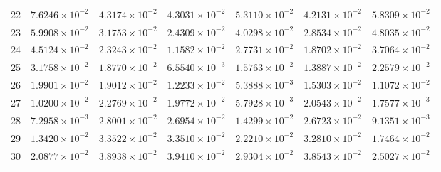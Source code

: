 \begin{table}[H]
\begin{tabular}{@{}rrrrrrr@{}}
22 & $7.6246\times10^{-2}$ & $4.3174\times10^{-2}$ & $4.3031\times10^{-2}$ & $5.3110\times10^{-2}$ & $4.2131\times10^{-2}$ & $5.8309\times10^{-2}$\\
23 & $5.9908\times10^{-2}$ & $3.1753\times10^{-2}$ & $2.4309\times10^{-2}$ & $4.0298\times10^{-2}$ & $2.8534\times10^{-2}$ & $4.8035\times10^{-2}$\\
24 & $4.5124\times10^{-2}$ & $2.3243\times10^{-2}$ & $1.1582\times10^{-2}$ & $2.7731\times10^{-2}$ & $1.8702\times10^{-2}$ & $3.7064\times10^{-2}$\\
25 & $3.1758\times10^{-2}$ & $1.8770\times10^{-2}$ & $6.5540\times10^{-3}$ & $1.5763\times10^{-2}$ & $1.3887\times10^{-2}$ & $2.2579\times10^{-2}$\\
26 & $1.9901\times10^{-2}$ & $1.9012\times10^{-2}$ & $1.2233\times10^{-2}$ & $5.3888\times10^{-3}$ & $1.5303\times10^{-2}$ & $1.1072\times10^{-2}$\\
27 & $1.0200\times10^{-2}$ & $2.2769\times10^{-2}$ & $1.9772\times10^{-2}$ & $5.7928\times10^{-3}$ & $2.0543\times10^{-2}$ & $1.7577\times10^{-3}$\\
28 & $7.2958\times10^{-3}$ & $2.8001\times10^{-2}$ & $2.6954\times10^{-2}$ & $1.4299\times10^{-2}$ & $2.6723\times10^{-2}$ & $9.1351\times10^{-3}$\\
29 & $1.3420\times10^{-2}$ & $3.3522\times10^{-2}$ & $3.3510\times10^{-2}$ & $2.2210\times10^{-2}$ & $3.2810\times10^{-2}$ & $1.7464\times10^{-2}$\\
30 & $2.0877\times10^{-2}$ & $3.8938\times10^{-2}$ & $3.9410\times10^{-2}$ & $2.9304\times10^{-2}$ & $3.8543\times10^{-2}$ & $2.5027\times10^{-2}$\\
\bottomrule
\end{tabular}
\end{table}

